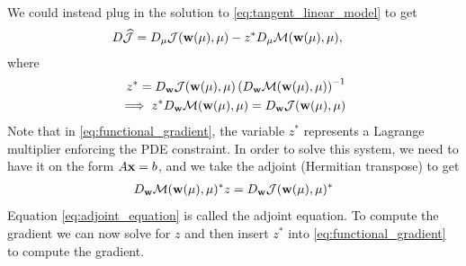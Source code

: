 We could instead plug in the solution to
\eqref{eq:tangent_linear_model} to get
\begin{align}
   D  \widehat{\mathcal{J}}
      &= D_{\mu}\mathcal{J}(\mathbf{w}(\mu), \mu) - z^* D_{\mu} \mathcal{M}(\mathbf{w}(\mu), \mu),
        \label{eq:functional_gradient}
\end{align}
where
\begin{align*}
  z^* = D_{\mathbf{w}}\mathcal{J}(\mathbf{w}(\mu), \mu) \left(  D_{\mathbf{w}} \mathcal{M}(\mathbf{w}(\mu), \mu) \right)^{-1} \\ 
  \implies z^* D_{\mathbf{w}} \mathcal{M}(\mathbf{w}(\mu), \mu) =  D_{\mathbf{w}}\mathcal{J}(\mathbf{w}(\mu), \mu)
  \label{eq:adjoint_equation}
\end{align*}
Note that in \eqref{eq:functional_gradient}, the variable $z^*$
represents a Lagrange multiplier enforcing the PDE constraint.  
In order to solve this system, we need to have it on the form $A\mathbf{x} =
b$, and we take the adjoint (Hermitian transpose) to get
\begin{align}
  D_{\mathbf{w}} \mathcal{M}(\mathbf{w}(\mu), \mu)^* z = D_{\mathbf{w}}\mathcal{J}(\mathbf{w}(\mu), \mu)^*
\end{align}
Equation \eqref{eq:adjoint_equation} is called the adjoint equation.
To compute the gradient we can now solve for $z$ and then insert $z^*$
into \eqref{eq:functional_gradient} to compute the gradient.





